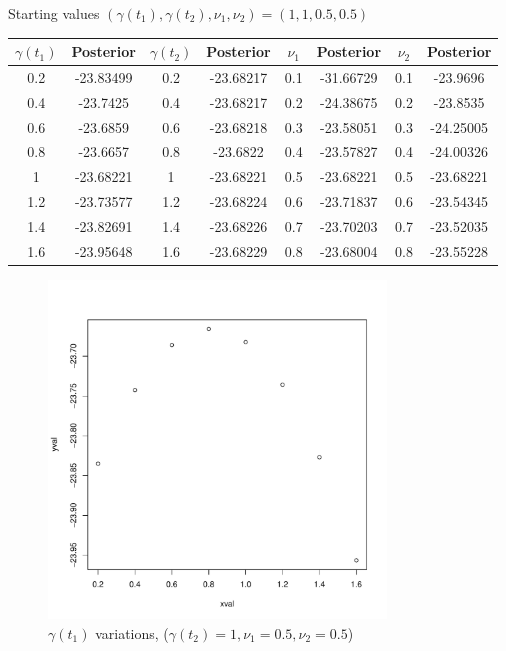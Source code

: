 \documentclass[a4paper,11pt]{article}
\begin{document}
Starting values $(\gamma(t_1), \gamma(t_2), \nu_1, \nu_2) = (1, 1, 0.5, 0.5)$
\begin{table}[H]
\centering
\begin{tabular}{|c|c||c|c||c|c||c|c|}
\hline
$\gamma(t_1)$ & Posterior & $\gamma(t_2)$ & Posterior & $\nu_1$ & Posterior & $\nu_2$ & Posterior \\ \hline
0.2 & -23.83499 & 0.2 & -23.68217 & 0.1 & -31.66729 & 0.1 & -23.9696 \\ \hline
0.4 & -23.7425 & 0.4 & -23.68217 & 0.2 & -24.38675 & 0.2 & -23.8535 \\ \hline
0.6 & -23.6859 & 0.6 & -23.68218 & 0.3 & -23.58051 & 0.3 & -24.25005 \\ \hline
0.8 & -23.6657 & 0.8 & -23.6822 & 0.4 & -23.57827 & 0.4 & -24.00326 \\ \hline
1 &  -23.68221  & 1 & -23.68221 & 0.5 & -23.68221 & 0.5 & -23.68221 \\ \hline
1.2 & -23.73577 & 1.2 & -23.68224 & 0.6 & -23.71837 & 0.6 & -23.54345 \\ \hline
1.4 & -23.82691 & 1.4 & -23.68226 & 0.7 & -23.70203 & 0.7 & -23.52035 \\ \hline
1.6 & -23.95648 & 1.6 & -23.68229 & 0.8 & -23.68004 & 0.8 & -23.55228 \\ \hline
\end{tabular}
\end{table}

\begin{figure}[H]
\centering
\includegraphics[width=0.8\textwidth]{test2_gamma1.pdf}
\caption{$\gamma(t_1)$ variations, ($\gamma(t_2) = 1, \nu_1 = 0.5, \nu_2 = 0.5$)}
\end{figure}
\end{document}
